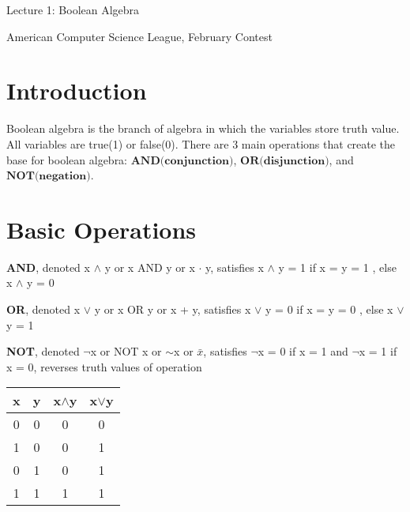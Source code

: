\documentclass[10pt]{article}
\begin{document}
    \noindent
    \begin{center}

        \hrulefill

        \vspace{5pt}

        \vspace{0pt}

        {\Large \hfill  Lecture 1: Boolean Algebra\hfill}
        \vspace{10pt}

        {\large \hfill  American Computer Science League, February Contest\hfill}
        \vspace{10pt}


        \vspace{-3pt}
        \hrulefill
    \end{center}


\section{Introduction}
Boolean algebra is the branch of algebra in which the variables store truth value. All variables are true(1) or false(0).
There are 3 main operations that create the base for boolean algebra: $\textbf{AND(conjunction)}$, $\textbf{OR(disjunction)}$, and $\textbf{NOT(negation)}$.

\bigskip
\noindent
\section{Basic Operations}
\textbf{AND}, denoted x $\land$ y or x AND y or x $\cdot$ y, satisfies x $\land$ y = 1 if x = y = 1 , else x $\land$ y = 0

\noindent
\textbf{OR}, denoted x $\lor$ y or x OR y or x + y, satisfies x $\lor$ y = 0 if x = y = 0 , else x $\lor$ y = 1

\noindent
\textbf{NOT}, denoted $\neg$x or NOT x or $\sim$x or $\bar{x}$, satisfies $\neg$x = 0 if x = 1 and $\neg$x = 1 if x = 0, reverses truth values of operation

\begin{center}
\begin{tabular}{ |c|c|c|c| }
 \hline
 x & y & x$\land$y & x$\lor$y \\
 \hline
  0 & 0 & 0 & 0 \\
 \hline
 1 & 0 & 0 & 1 \\
 \hline
 0 & 1 & 0 & 1 \\
 \hline
 1 & 1 & 1 & 1 \\
 \hline
\end{tabular}
\end{center}
\end{document}
